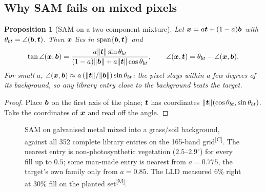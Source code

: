 \documentclass[11pt,a4paper]{article}
\theoremstyle{plain}
\newtheorem{proposition}{Proposition}[section]
\theoremstyle{definition}
\theoremstyle{remark}
\newcommand{\spn}{\operatorname{span}}
\newcommand{\x}{\B{x}}
\newcommand{\bvec}{\B{b}}
\newcommand{\tv}{\B{t}}
\newcommand{\nrm}[1]{\lVert #1\rVert}
\newcommand{\meas}{\textsuperscript{\textsf{\scriptsize[M]}}}
\newcommand{\comp}{\textsuperscript{\textsf{\scriptsize[C]}}}
\begin{document}
\subsection{Why SAM fails on mixed pixels}

\begin{proposition}[SAM on a two-component mixture]
\label{prop:sam}
Let $\x=a\tv+(1-a)\bvec$ with $\theta_{bt}=\angle(\bvec,\tv)$. Then $\x$ lies in $\spn\{\bvec,\tv\}$ and
\[
  \tan\angle(\x,\bvec)=\frac{a\nrm{\tv}\sin\theta_{bt}}{(1-a)\nrm{\bvec}+a\nrm{\tv}\cos\theta_{bt}},\qquad
  \angle(\x,\tv)=\theta_{bt}-\angle(\x,\bvec).
\]
For small $a$, $\angle(\x,\bvec)\approx a\,(\nrm{\tv}/\nrm{\bvec})\sin\theta_{bt}$: the pixel stays within a few degrees of
its background, so any library entry close to the background beats the target.
\end{proposition}
\begin{proof}
Place $\bvec$ on the first axis of the plane; $\tv$ has coordinates $\nrm{\tv}(\cos\theta_{bt},\sin\theta_{bt})$. Take the
coordinates of $\x$ and read off the angle.
\end{proof}

\begin{figure}[ht]
\centering
{}
\caption{SAM on galvanised metal mixed into a grass/soil background, against all 352 complete library entries on the
165-band grid\comp. The nearest entry is non-photosynthetic vegetation ($2.5$--$2.9^\circ$) for every fill up to $0.5$; some
man-made entry is nearest from $a=0.775$, the target's own family only from $a=0.85$. The LLD measured 6\% right at 30\% fill on the planted set\meas.}
\label{fig:sam}
\end{figure}
\end{document}
